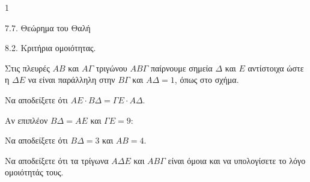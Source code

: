 \begin{ylh}{1}
    \item 7.7. Θεώρημα του Θαλή
    \item 8.2. Κριτήρια ομοιότητας.
\end{ylh}
\begin{figure}
\end{figure}
Στις πλευρές $AB$ και $A\Gamma$ τριγώνου $AB\Gamma$ παίρνουμε σημεία $\Delta$ και $E$ αντίστοιχα ώστε η $\Delta E$ να είναι παράλληλη στην $B\Gamma$ και $A\Delta = 1$, όπως στο σχήμα.
\begin{alist}
    \item Να αποδείξετε ότι $AE \cdot B\Delta = \Gamma E \cdot A\Delta$. 
    \item Αν επιπλέον $B\Delta = AE$ και $\Gamma E = 9$:
    \begin{rlist}
        \item Να αποδείξετε ότι $B\Delta = 3$ και $AB = 4$. 
        \item Να αποδείξετε ότι τα τρίγωνα $A\Delta E$ και $AB\Gamma$ είναι όμοια και να υπολογίσετε το λόγο ομοιότητάς τους. 
    \end{rlist}
\end{alist}